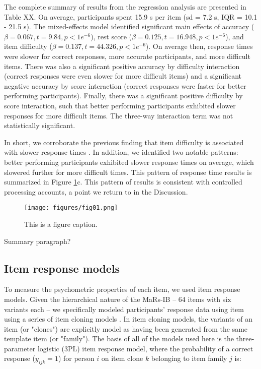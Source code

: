 \documentclass[a4paper,man,natbib]{apa6}
\begin{document}
The complete summary of results from the regression analysis are presented in Table XX. On average, participants spent 15.9 s per item (sd = 7.2 s, IQR = 10.1 - 21.5 s). The mixed-effects model identified significant main effects of accuracy ($\beta = 0.067, t = 9.84, p < 1e^{-6}$), rest score ($\beta = 0.125, t = 16.948, p < 1e^{-6}$), and item difficulty ($\beta = 0.137, t = 44.326, p < 1e^{-6}$). On average then, response times were slower for correct responses, more accurate participants, and more difficult items. There was also a significant positive accuracy by difficulty interaction (correct responses were even slower for more difficult items) and a significant negative accuracy by score interaction (correct responses were faster for better performing participants). Finally, there was a significant positive difficulty by score interaction, such that better performing participants exhibited slower responses for more difficult items. The three-way interaction term was not statistically significant. 

In short, we corroborate the previous finding that item difficulty is associated with slower response times \citep{chierchia2019matrix}. In addition, we identified two notable patterns: better performing participants exhibited slower response times on average, which slowered further for more difficult times. This pattern of response time results is summarized in Figure \ref{fig:fig01}c. This pattern of results is consistent with controlled processing accounts, a point we return to in the Discussion.

\begin{figure}
\centering
\texttt{[image: figures/fig01.png]}
\caption{\label{fig:fig01}This is a figure caption.}
\end{figure}
 
Summary paragraph?
 
\subsection{Item response models}

To measure the psychometric properties of each item, we used item response models. Given the hierarchical nature of the MaRs-IB -- 64 items with six variants each -- we specifically modeled participants' response data using item using a series of item cloning models \citep{geerlings2011modeling, cho2014additive, lathrop2017item}. In item cloning models, the variants of an item (or "clones") are explicitly model as having been generated from the same template item (or "family"). The basis of all of the models used here is the three-parameter logistic (3PL) item response model, where the probability of a correct response ($y_{ijk} = 1$) for person $i$ on item clone $k$ belonging to item family $j$ is:
\end{document}
